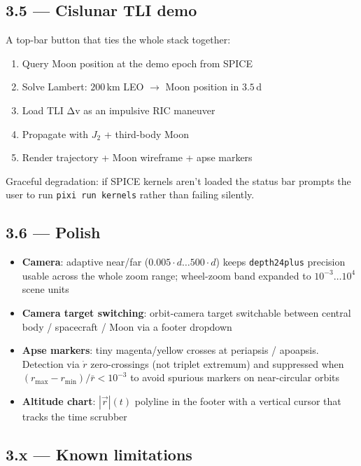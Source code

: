 \documentclass[11pt, a4paper]{article}
\begin{document}
\subsection{3.5 — Cislunar TLI demo}

A top-bar button that ties the whole stack together:

\begin{enumerate}[leftmargin=*]
  \item Query Moon position at the demo epoch from SPICE
  \item Solve Lambert: $200\,$km LEO $\to$ Moon position in $3.5\,$d
  \item Load TLI Δv as an impulsive RIC maneuver
  \item Propagate with $J_2$ + third-body Moon
  \item Render trajectory + Moon wireframe + apse markers
\end{enumerate}

Graceful degradation: if SPICE kernels aren't loaded the status bar prompts
the user to run \texttt{pixi run kernels} rather than failing silently.

\subsection{3.6 — Polish}

\begin{itemize}[leftmargin=*]
  \item \textbf{Camera}: adaptive near/far ($0.005 \cdot d \dots 500 \cdot d$)
        keeps \texttt{depth24plus} precision usable across the whole zoom
        range; wheel-zoom band expanded to
        $10^{-3} \dots 10^4$ scene units
  \item \textbf{Camera target switching}: orbit-camera target switchable
        between central body / spacecraft / Moon via a footer dropdown
  \item \textbf{Apse markers}: tiny magenta/yellow crosses at periapsis /
        apoapsis. Detection via $\dot r$ zero-crossings (not triplet
        extremum) and suppressed when
        $(r_\text{max} - r_\text{min}) / \bar r < 10^{-3}$ to avoid spurious
        markers on near-circular orbits
  \item \textbf{Altitude chart}: $|\vec r|(t)$ polyline in the footer with
        a vertical cursor that tracks the time scrubber
\end{itemize}

\subsection{3.x — Known limitations}
\end{document}
